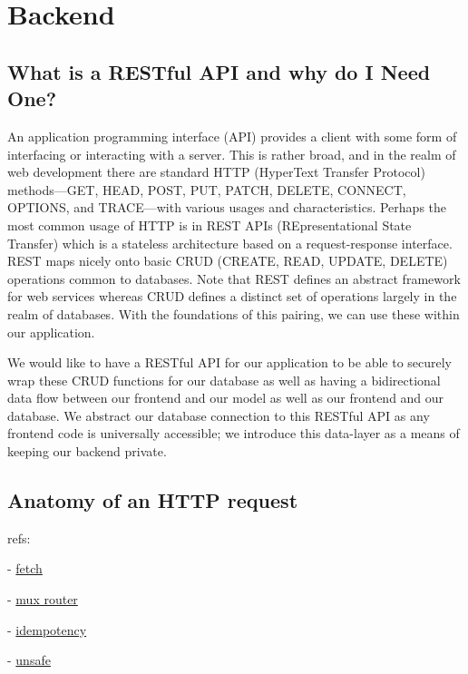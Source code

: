 \documentclass[11pt, twoside, reqno]{book}
\begin{document}
\startmain%


\chapter{Backend}

\section{What is a RESTful API and why do I Need One?}

An application programming interface (API) provides a client with some form of interfacing or interacting with a server. This is rather broad, and in the realm of web development there are standard HTTP (HyperText Transfer Protocol) methods—GET, HEAD, POST, PUT, PATCH, DELETE, CONNECT, OPTIONS, and TRACE—with various usages and characteristics. Perhaps the most common usage of HTTP is in REST APIs (REpresentational State Transfer) which is a stateless architecture based on a request-response interface. REST maps nicely onto basic CRUD (CREATE, READ, UPDATE, DELETE) operations common to databases. Note that REST defines an abstract framework for web services whereas CRUD defines a distinct set of operations largely in the realm of databases. With the foundations of this pairing, we can use these within our application.

We would like to have a RESTful API for our application to be able to securely wrap these CRUD functions for our database as well as having a bidirectional data flow between our frontend and our model as well as our frontend and our database. We abstract our database connection to this RESTful API as any frontend code is universally accessible; we introduce this data-layer as a means of keeping our backend private.

\section{Anatomy of an HTTP request}

refs:

- \href{https://developer.mozilla.org/en-US/docs/Web/API/Fetch_API}{fetch}

- \href{http://www.gorillatoolkit.org/pkg/mux}{mux router}

- \href{https://developer.mozilla.org/en-US/docs/Glossary/idempotent}{idempotency}

- \href{https://developer.mozilla.org/en-US/docs/Glossary/safe}{unsafe}
\end{document}
